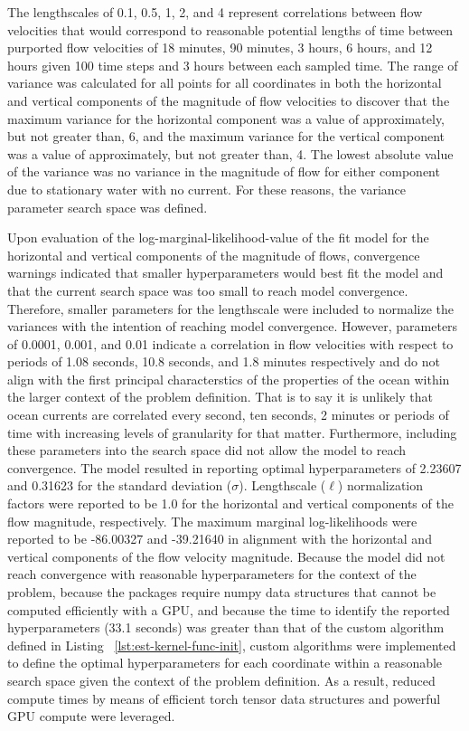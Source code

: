 \documentclass[11pt]{article}
\begin{document}
The lengthscales of 0.1, 0.5, 1, 2, and 4 represent correlations between flow velocities that would correspond to reasonable potential lengths of time between purported flow velocities of 18 minutes, 90 minutes, 3 hours, 6 hours, and 12 hours given 100 time steps and 3 hours between each sampled time. The range of variance was calculated for all points for all coordinates in both the horizontal and vertical components of the magnitude of flow velocities to discover that the maximum variance for the horizontal component was a value of approximately, but not greater than, 6, and the maximum variance for the vertical component was a value of approximately, but not greater than, 4. The lowest absolute value of the variance was no variance in the magnitude of flow for either component due to stationary water with no current. For these reasons, the variance parameter search space was defined. 

Upon evaluation of the log-marginal-likelihood-value of the fit model for the horizontal and vertical components of the magnitude of flows, convergence warnings indicated that smaller hyperparameters would best fit the model and that the current search space was too small to reach model convergence. Therefore, smaller parameters for the lengthscale were included to normalize the variances with the intention of reaching model convergence. However, parameters of 0.0001, 0.001, and 0.01 indicate a correlation in flow velocities with respect to periods of 1.08 seconds, 10.8 seconds, and 1.8 minutes respectively and do not align with the first principal characterstics of the properties of the ocean within the larger context of the problem definition. That is to say it is unlikely that ocean currents are correlated every second, ten seconds, 2 minutes or periods of time with increasing levels of granularity for that matter. Furthermore, including these parameters into the search space did not allow the model to reach convergence. The model resulted in reporting optimal hyperparameters of 2.23607 and 0.31623 for the standard deviation ($\sigma$). Lengthscale ($\ell$) normalization factors were reported to be 1.0 for the horizontal and vertical components of the flow magnitude, respectively. The maximum marginal log-likelihoods were reported to be -86.00327 and -39.21640 in alignment with the horizontal and vertical components of the flow velocity magnitude. Because the model did not reach convergence with reasonable hyperparameters for the context of the problem, because the packages require numpy data structures that cannot be computed efficiently with a GPU, and because the time to identify the reported hyperparameters (33.1 seconds) was greater than that of the custom algorithm defined in Listing ~\ref{lst:est-kernel-func-init}, custom algorithms were implemented to define the optimal hyperparameters for each coordinate within a reasonable search space given the context of the problem definition. As a result, reduced compute times by means of efficient torch tensor data structures and powerful GPU compute were leveraged. 
\end{document}
